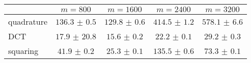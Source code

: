 \centering
\renewcommand{\arraystretch}{1.2}
\begin{tabular}{@{}lcccc@{}}
\toprule
 & $m=800$ & $m=1600$ & $m=2400$ & $m=3200$\\
\midrule
quadrature & $136.3$ $\pm$ $0.5$ & $129.8$ $\pm$ $0.6$ & $414.5$ $\pm$ $1.2$ & $578.1$ $\pm$ $6.6$ \\
DCT & $17.9$ $\pm$ $20.8$ & $15.6$ $\pm$ $0.2$ & $22.2$ $\pm$ $0.1$ & $29.2$ $\pm$ $0.3$ \\
squaring & $41.9$ $\pm$ $0.2$ & $25.3$ $\pm$ $0.1$ & $135.5$ $\pm$ $0.6$ & $73.3$ $\pm$ $0.1$ \\
\bottomrule
\end{tabular}
